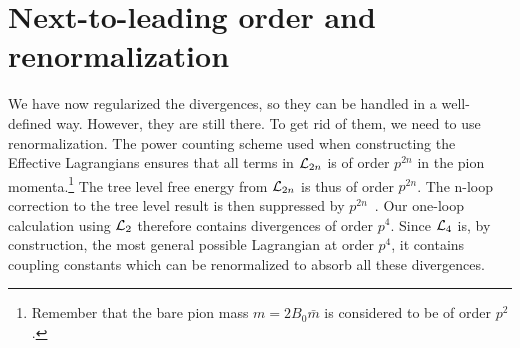\section{Next-to-leading order and renormalization}
We have now regularized the divergences, so they can be handled in a well-defined way.
However, they are still there.
To get rid of them, we need to use renormalization.
The power counting scheme used when constructing the Effective Lagrangians ensures that all terms in $\mathcal{L}_{2n}$ is of order $p^{2n}$ in the pion momenta.\footnote{Remember that the bare pion mass $m = 2B_0 \bar m$ is considered to be of order $p^2$.}
The tree level free energy from $\mathcal{L}_{2n}$ is thus of order $p^{2n}$.
The n-loop correction to the tree level result is then suppressed by $p^{2n}$~\cite{Gasser-Leutwyler:chiral,WeinbergPhenom}.
Our one-loop calculation using $\mathcal{L}_2$ therefore contains divergences of order $p^{4}$. 
Since $\mathcal{L}_4$ is, by construction, the most general possible Lagrangian at order $p^4$, it contains coupling constants which can be renormalized to absorb all these divergences.

